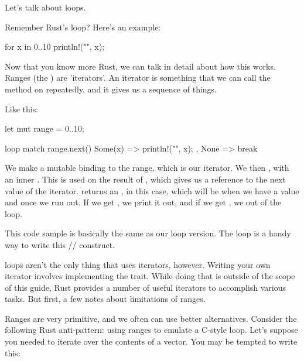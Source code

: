 Let's talk about loops.

\blank

Remember Rust's  loop? Here's an example:

\begin{rustc}
for x in 0..10 {
    println!("{}", x);
}
\end{rustc}

Now that you know more Rust, we can talk in detail about how this works. Ranges (the ) are 'iterators'. An iterator is 
something that we can call the  method on repeatedly, and it gives us a sequence of things.

\blank

Like this:

\begin{rustc}
let mut range = 0..10;

loop {
    match range.next() {
        Some(x) => {
            println!("{}", x);
        },
        None => { break }
    }
}
\end{rustc}

We make a mutable binding to the range, which is our iterator. We then , with an inner . This  is 
used on the result of , which gives us a reference to the next value of the iterator.  returns an 
, in this case, which will be  when we have a value and  once we run out. If we get 
, we print it out, and if we get , we  out of the loop.

\blank

This code sample is basically the same as our  loop version. The  loop is a handy way to write this 
// construct.

\blank

 loops aren't the only thing that uses iterators, however. Writing your own iterator involves implementing the  
trait. While doing that is outside of the scope of this guide, Rust provides a number of useful iterators to accomplish various tasks. 
But first, a few notes about limitations of ranges.

\blank

Ranges are very primitive, and we often can use better alternatives. Consider the following Rust anti-pattern: using ranges to emulate a 
C-style  loop. Let’s suppose you needed to iterate over the contents of a vector. You may be tempted to write this:

